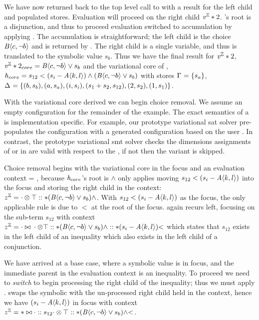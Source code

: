 We have now returned back to the top level call to \evAnd{} with a result for
the left child and populated stores. Evaluation will proceed on the right child
$\mathit{v^{\mathbb{Z}}}*{2}$. 's root is a disjunction, and thus to proceed evaluation
switched to accumulation by applying \evAcc{}. The accumulation is
straightforward; the left child is the choice $\chc[B]{c, \neg b}$ and is
returned by \acChc{}. The right child is a single variable, and thus is
translated to the symbolic value $s_{b}$. Thus we have the final result for
$\mathit{v^{\mathbb{Z}}}*{2}$, $\eIL*{2}_{core} = \chc[B]{c,\neg b} \vee{} s_{b}$ and the
variational core of \hV{}, $\hV{}_{core} = s_{12} < (s_{i} - \chc[A]{k,l})
\wedge{} (\chc[B]{c,\neg b} \vee{} s_{b})$ with stores $\eStore{}=\set{s_{a}}$,
$\aStore{}=\set{(b, s_{b}),(a,s_{a}),(i, s_{i}),(s_{1} + s_{2}, s_{12}),
  (2,s_{2}), (1,s_{1})}$.

With the variational core derived we can begin choice removal. We assume an
empty configuration for the remainder of the example. The exact semantics of a
\vc{} is implementation specific. For example, our prototype variational
\ac{sat} solver pre-populates the configuration with a generated configuration
based on the user \vc{}. In contrast, the prototype variational \ac{smt} solver
checks the dimensions assignments of \true{} or \false{} in \crChc{} are valid
with respect to the \vc{}, if not then the variant is skipped.

Choice removal begins with the variational core in the focus and an evaluation
context \zipper{} = \inRoot{}, because $\mathit{h}_{core}$'s root is $\wedge$ only
\crBool{} applies moving $s_{12} < (s_{i} - \chc[A]{k,l})$ into the focus and
storing the right child in the context: $\zipper =
\inBoolL*{\inRoot{}}{(\chc[B]{c,\neg b} \vee{} s_{b})}{\wedge}$. With $s_{12} <
(s_{i} - \chc[A]{k,l})$ as the focus, the only applicable rule is \crInEq{} due
to $<$ at the root of the focus. \crInEq{} again recurs left, focusing on the
sub-term $s_{12}$ with context $\zipper =
\inInEqL*{\inBoolL*{\inRoot{}}{(\chc[B]{c,\neg b} \vee{} s_{b})}{\wedge}}{(s_{i}
  - \chc[A]{k,l})}{<}$ which states that $s_{12}$ exists in the left child of an
inequality which also exists in the left child of a conjunction.

We have arrived at a base case, where a symbolic value is in focus, and the
immediate parent in the evaluation context is an inequality. To proceed we need
to \emph{switch} to begin processing the right child of the inequality; thus we
must apply \crInEqL{}. \crInEqL{} swaps the symbolic with the un-processed right
child held in the context, hence we have $(s_{i} - \chc[A]{k,l})$ in focus with
context $\zipper = \inInEqR*{s_{12}}{\inBoolL*{\inRoot{}}{(\chc[B]{c,\neg b} \vee{}
    s_{b})}{\wedge}}{<}$. 


